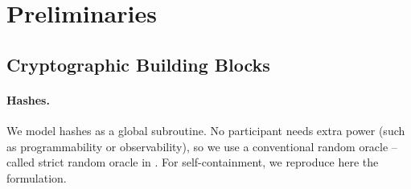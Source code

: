 \section{Preliminaries}
\label{sec:preliminaries}

\subsection{Cryptographic Building Blocks}
\label{ssec:bbs}








\paragraph{Hashes.} %
We model hashes as a global subroutine. No participant needs extra power (such
as programmability or observability), so we use a conventional random oracle --
called strict random oracle in \cite{cdg+18}. For self-containment, we reproduce
here the formulation.

